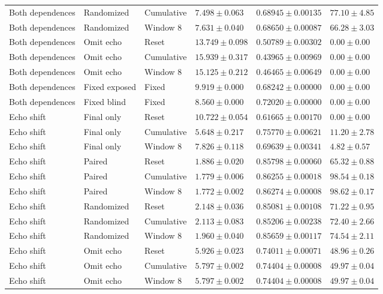 \begin{longtable}{@{}llllll@{}}
Both dependences & Randomized & Cumulative & $7.498 \pm 0.063$ & $0.68945 \pm 0.00135$ & $77.10 \pm 4.85$ \\
Both dependences & Randomized & Window 8 & $7.631 \pm 0.040$ & $0.68650 \pm 0.00087$ & $66.28 \pm 3.03$ \\
Both dependences & Omit echo & Reset & $13.749 \pm 0.098$ & $0.50789 \pm 0.00302$ & $0.00 \pm 0.00$ \\
Both dependences & Omit echo & Cumulative & $15.939 \pm 0.317$ & $0.43965 \pm 0.00969$ & $0.00 \pm 0.00$ \\
Both dependences & Omit echo & Window 8 & $15.125 \pm 0.212$ & $0.46465 \pm 0.00649$ & $0.00 \pm 0.00$ \\
Both dependences & Fixed exposed & Fixed & $9.919 \pm 0.000$ & $0.68242 \pm 0.00000$ & $0.00 \pm 0.00$ \\
Both dependences & Fixed blind & Fixed & $8.560 \pm 0.000$ & $0.72020 \pm 0.00000$ & $0.00 \pm 0.00$ \\
Echo shift & Final only & Reset & $10.722 \pm 0.054$ & $0.61665 \pm 0.00170$ & $0.00 \pm 0.00$ \\
Echo shift & Final only & Cumulative & $5.648 \pm 0.217$ & $0.75770 \pm 0.00621$ & $11.20 \pm 2.78$ \\
Echo shift & Final only & Window 8 & $7.826 \pm 0.118$ & $0.69639 \pm 0.00341$ & $4.82 \pm 0.57$ \\
Echo shift & Paired & Reset & $1.886 \pm 0.020$ & $0.85798 \pm 0.00060$ & $65.32 \pm 0.88$ \\
Echo shift & Paired & Cumulative & $1.779 \pm 0.006$ & $0.86255 \pm 0.00018$ & $98.54 \pm 0.18$ \\
Echo shift & Paired & Window 8 & $1.772 \pm 0.002$ & $0.86274 \pm 0.00008$ & $98.62 \pm 0.17$ \\
Echo shift & Randomized & Reset & $2.148 \pm 0.036$ & $0.85081 \pm 0.00108$ & $71.22 \pm 0.95$ \\
Echo shift & Randomized & Cumulative & $2.113 \pm 0.083$ & $0.85206 \pm 0.00238$ & $72.40 \pm 2.66$ \\
Echo shift & Randomized & Window 8 & $1.960 \pm 0.040$ & $0.85659 \pm 0.00117$ & $74.54 \pm 2.11$ \\
Echo shift & Omit echo & Reset & $5.926 \pm 0.023$ & $0.74011 \pm 0.00071$ & $48.96 \pm 0.26$ \\
Echo shift & Omit echo & Cumulative & $5.797 \pm 0.002$ & $0.74404 \pm 0.00008$ & $49.97 \pm 0.04$ \\
Echo shift & Omit echo & Window 8 & $5.797 \pm 0.002$ & $0.74404 \pm 0.00008$ & $49.97 \pm 0.04$ \\

\end{longtable}
